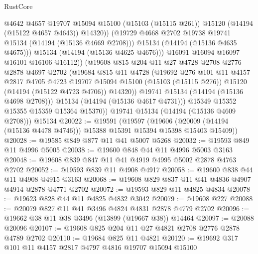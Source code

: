 \begin{lexlean}{RustCore}
\begin{coremodule}
                        @4642
                        @4657
                        @19707
                        @15094
                        @15100
                        (@15103 (@15115 @261))
                        @15120
                        (@14194 (@15122 @4657 @4643))
                        @14320))
                    (@19729 @4668 @2702 @19738 @19741 @15134 (@14194 (@15136 @4669 @2708)))
                    @15134
                    (@14194 (@15136 @4635 @4675)))
                  @15134
                  (@14194 (@15136 @4625 @4676)))
                @16091
                @16094
                @16097
                @16101
                @16106
                @16112))
            (@19608
              @815
              @204
              @11
              @27
              @4728
              @2708
              @2776
              @2878
              @4697
              @2702
              (@19684
                @815
                @11
                @4728
                (@19692
                  @276
                  @101
                  @11
                  @4157
                  @2817
                  @4705
                  @4723
                  @19707
                  @15094
                  @15100
                  (@15103 (@15115 @276))
                  @15120
                  (@14194 (@15122 @4723 @4706))
                  @14320))
              @19741
              @15134
              (@14194 (@15136 @4698 @2708)))
            @15134
            (@14194 (@15136 @4617 @4731)))
          @15349
          @15352
          @15355
          @15359
          @15364
          @15370))
      @19741
      @15134
      (@14194 (@15136 @4609 @2708)))
    @15134
@20022 := @19591
    (@19597
      (@19606 (@20009 (@14194 (@15136 @4478 @4746))) @15388 @15391 @15394 @15398 @15403 @15409))
@20028 := @19585 @849 @877 @11 @41 @5007 @5268
@20032 := @19593 @849 @11 @4996 @5005
@20038 := @19600 @848 @44 @11 @4996 @5003 @3163
@20048 := @19608 @839 @847 @11 @41 @4919 @4995 @5002 @2878 @4763 @2702
@20052 := @19593 @839 @11 @4908 @4917
@20058 := @19600 @838 @44 @11 @4908 @4915 @3163
@20068 := @19608 @829 @837 @11 @41 @4836 @4907 @4914 @2878 @4771 @2702
@20072 := @19593 @829 @11 @4825 @4834
@20078 := @19623 @828 @44 @11 @4825 @4832 @3042
@20079 := @19608 @227
@20088 := @20079 @827 @11 @41 @3496 @4824 @4831 @2878 @4779 @2702
@20096 := @19662 @38 @11 @38 @3496 (@13899 (@19667 @38)) @14464
@20097 := @20088 @20096
@20107 := @19608 @825 @204 @11 @27 @4821 @2708 @2776 @2878 @4789 @2702
@20110 := @19684 @825 @11 @4821
@20120 := @19692 @317 @101 @11 @4157 @2817 @4797 @4816 @19707 @15094 @15100

\end{coremodule}
\end{lexlean}
